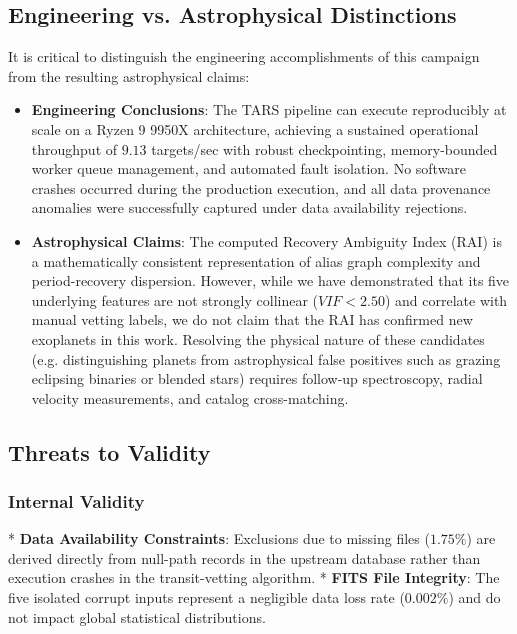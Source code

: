 \subsection{Engineering vs. Astrophysical Distinctions} \label{sec:disc_eng_vs_astro}
It is critical to distinguish the engineering accomplishments of this campaign from the resulting astrophysical claims:
\begin{itemize}
    \item \textbf{Engineering Conclusions}: The TARS pipeline can execute reproducibly at scale on a Ryzen 9 9950X architecture, achieving a sustained operational throughput of $9.13$ targets/sec with robust checkpointing, memory-bounded worker queue management, and automated fault isolation. No software crashes occurred during the production execution, and all data provenance anomalies were successfully captured under data availability rejections.
    \item \textbf{Astrophysical Claims}: The computed Recovery Ambiguity Index (RAI) is a mathematically consistent representation of alias graph complexity and period-recovery dispersion. However, while we have demonstrated that its five underlying features are not strongly collinear ($VIF < 2.50$) and correlate with manual vetting labels, we do not claim that the RAI has confirmed new exoplanets in this work. Resolving the physical nature of these candidates (e.g. distinguishing planets from astrophysical false positives such as grazing eclipsing binaries or blended stars) requires follow-up spectroscopy, radial velocity measurements, and catalog cross-matching.
\end{itemize}

\subsection{Threats to Validity} \label{sec:disc_threats_to_validity}

\subsubsection{Internal Validity}
*   \textbf{Data Availability Constraints}: Exclusions due to missing files ($1.75\%$) are derived directly from null-path records in the upstream database rather than execution crashes in the transit-vetting algorithm.
*   \textbf{FITS File Integrity}: The five isolated corrupt inputs represent a negligible data loss rate ($0.002\%$) and do not impact global statistical distributions.

